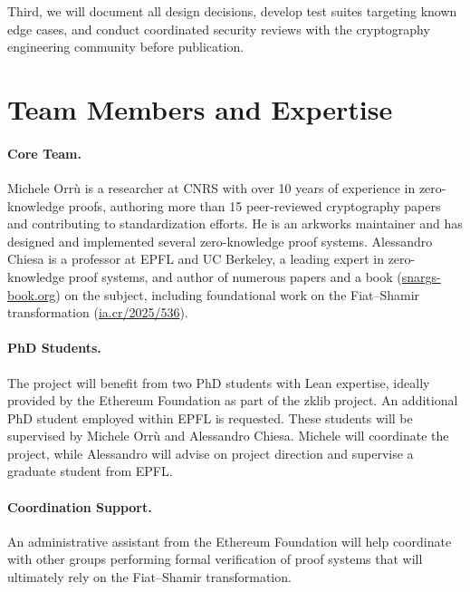 \documentclass{article}
\begin{document}
Third, we will document all design decisions, develop test suites targeting known edge cases, and conduct coordinated security reviews with the cryptography engineering community before publication.

\section{Team Members and Expertise}

\paragraph{Core Team.}
Michele Orrù is a researcher at CNRS with over 10 years of experience in zero-knowledge proofs, authoring more than 15 peer-reviewed cryptography papers and contributing to standardization efforts. He is an arkworks maintainer and has designed and implemented several zero-knowledge proof systems.
Alessandro Chiesa is a professor at EPFL and UC Berkeley, a leading expert in zero-knowledge proof systems, and author of numerous papers and a book (\href{https://snargs-book.org/}{snargs-book.org}) on the subject, including foundational work on the Fiat--Shamir transformation (\href{https://eprint.iacr.org/2025/536.pdf}{ia.cr/2025/536}).

\paragraph{PhD Students.}
The project will benefit from two PhD students with Lean expertise, ideally provided by the Ethereum Foundation as part of the zklib project. An additional PhD student employed within EPFL is requested. These students will be supervised by Michele Orrù and Alessandro Chiesa. Michele will coordinate the project, while Alessandro will advise on project direction and supervise a graduate student from EPFL.

\paragraph{Coordination Support.}
An administrative assistant from the Ethereum Foundation will help coordinate with other groups performing formal verification of proof systems that will ultimately rely on the Fiat--Shamir transformation.
\end{document}
